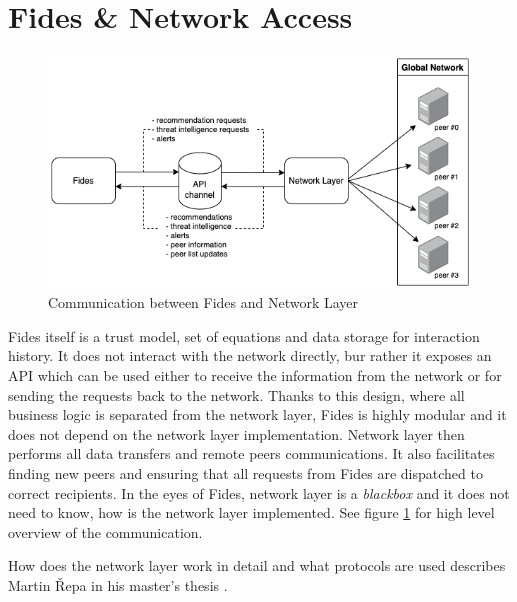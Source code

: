 \section{Fides \& Network Access}
\label{sec:fides-and-network-access}

\begin{figure}[ht]
    \centering
    \includegraphics[width=1.0\textwidth]{assets/tl_api_nl.png}
    \caption{Communication between Fides and Network Layer}
    \label{fig:fides-api-network}
\end{figure}

Fides itself is a trust model, set of equations and data storage for interaction history. 
It does not interact with the network directly, bur rather it exposes an API which can be used either to receive the information from the network or for sending the requests back to the network.
Thanks to this design, where all business logic is separated from the network layer, Fides is highly modular and it does not depend on the network layer implementation.
Network layer then performs all data transfers and remote peers communications.
It also facilitates finding new peers and ensuring that all requests from Fides are dispatched to correct recipients.
In the eyes of Fides, network layer is a \textit{blackbox} and it does not need to know, how is the network layer implemented.
See figure \ref{fig:fides-api-network} for high level overview of the communication.

How does the network layer work in detail and what protocols are used describes Martin Řepa in his master's thesis \cite{nl}.
